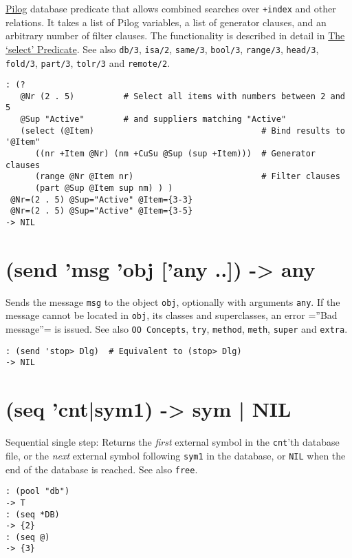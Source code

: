 {{{{{{{{\hyperref[ref.html-pilog]{Pilog} database predicate that allows combined
searches over \texttt{+index} and other relations. It takes a list of Pilog
variables, a list of generator clauses, and an arbitrary number of
filter clauses. The functionality is described in detail in
\hyperref[select.html]{The `select' Predicate}. See also \texttt{db/3}, \texttt{isa/2},
\texttt{same/3}, \texttt{bool/3}, \texttt{range/3}, \texttt{head/3}, \texttt{fold/3}, \texttt{part/3}, \texttt{tolr/3}
and \texttt{remote/2}.


\begin{verbatim}
: (?
   @Nr (2 . 5)          # Select all items with numbers between 2 and 5
   @Sup "Active"        # and suppliers matching "Active"
   (select (@Item)                                  # Bind results to '@Item"
      ((nr +Item @Nr) (nm +CuSu @Sup (sup +Item)))  # Generator clauses
      (range @Nr @Item nr)                          # Filter clauses
      (part @Sup @Item sup nm) ) )
 @Nr=(2 . 5) @Sup="Active" @Item={3-3}
 @Nr=(2 . 5) @Sup="Active" @Item={3-5}
-> NIL
\end{verbatim}

 
\section{(send 'msg 'obj ['any ..]) -> any}
\label{sec-8-1-19-16}


Sends the message \texttt{msg} to the object \texttt{obj}, optionally with arguments
\texttt{any}. If the message cannot be located in \texttt{obj}, its classes and
superclasses, an error =''Bad message''= is issued. See also
\texttt{OO Concepts}, \texttt{try}, \texttt{method}, \texttt{meth}, \texttt{super} and \texttt{extra}.


\begin{verbatim}
: (send 'stop> Dlg)  # Equivalent to (stop> Dlg)
-> NIL
\end{verbatim}

 
\section{(seq 'cnt|sym1) -> sym | NIL}
\label{sec-8-1-19-17}


Sequential single step: Returns the \emph{first} external symbol in the
\texttt{cnt}'th database file, or the \emph{next} external symbol following \texttt{sym1}
in the database, or \texttt{NIL} when the end of the database is reached. See
also \texttt{free}.


\begin{verbatim}
: (pool "db")
-> T
: (seq *DB)
-> {2}
: (seq @)
-> {3}
\end{verbatim}

}}}}}}}}
